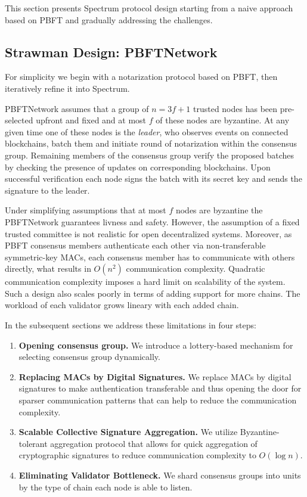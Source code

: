This section presents Spectrum protocol design starting from a naive approach based on PBFT and gradually addressing the challenges.

\subsection{Strawman Design: PBFTNetwork}\label{subsec:strawman-design}

For simplicity we begin with a notarization protocol based on PBFT, then iteratively refine it into Spectrum.

PBFTNetwork assumes that a group of ${n = 3f + 1}$ trusted nodes has been pre-selected upfront and fixed and at most $f$ of these nodes are byzantine.
At any given time one of these nodes is the \emph{leader}, who observes events on connected blockchains,
batch them and initiate round of notarization within the consensus group.
Remaining members of the consensus group verify the proposed batches by checking the presence of updates on corresponding blockchains.
Upon successful verification each node signs the batch with its secret key and sends the signature to the leader.

Under simplifying assumptions that at most $f$ nodes are byzantine the PBFTNetwork guarantees livness and safety.
However, the assumption of a fixed trusted committee is not realistic for open decentralized systems.
Moreover, as PBFT consensus members authenticate each other via non-transferable symmetric-key MACs, each consensus
member has to communicate with others directly, what results in $O(n^2)$ communication complexity.
Quadratic communication complexity imposes a hard limit on scalability of the system.
Such a design also scales poorly in terms of adding support for more chains.
The workload of each validator grows lineary with each added chain.

In the subsequent sections we address these limitations in four steps:
\begin{enumerate}
    \item \textbf{Opening consensus group.} We introduce a lottery-based mechanism for selecting consensus group dynamically.
    \item \textbf{Replacing MACs by Digital Signatures.} We replace MACs by digital signatures to make authentication transferable
    and thus opening the door for sparser communication patterns that can help to reduce the communication complexity.
    \item \textbf{Scalable Collective Signature Aggregation.} We utilize Byzantine-tolerant aggregation protocol that allows for
    quick aggregation of cryptographic signatures to reduce communication complexity to $O(\log n)$.
    \item \textbf{Eliminating Validator Bottleneck.} We shard consensus groups into units by the type of chain each node is able to listen.
\end{enumerate}

